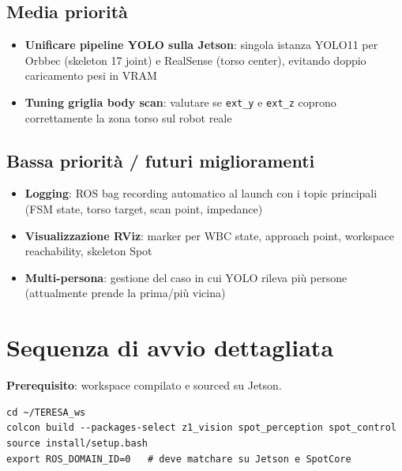 \documentclass[a4paper,11pt]{article}
\begin{document}
\begin{todobox}
\subsection*{Media priorità}
\begin{itemize}[leftmargin=1.5em]
  \item[$\square$] \textbf{Unificare pipeline YOLO sulla Jetson}: singola istanza YOLO11
        per Orbbec (skeleton 17 joint) e RealSense (torso center),
        evitando doppio caricamento pesi in VRAM
  \item[$\square$] \textbf{Tuning griglia body scan}: valutare se \texttt{ext\_y} e
        \texttt{ext\_z} coprono correttamente la zona torso sul robot reale
\end{itemize}

\subsection*{Bassa priorità / futuri miglioramenti}
\begin{itemize}[leftmargin=1.5em]
  \item[$\square$] \textbf{Logging}: ROS bag recording automatico al launch
        con i topic principali (FSM state, torso target, scan point, impedance)
  \item[$\square$] \textbf{Visualizzazione RViz}: marker per WBC state, approach point,
        workspace reachability, skeleton Spot
  \item[$\square$] \textbf{Multi-persona}: gestione del caso in cui YOLO rileva
        più persone (attualmente prende la prima/più vicina)
\end{itemize}
\end{todobox}

\section{Sequenza di avvio dettagliata}

\begin{warnbox}
\textbf{Prerequisito}: workspace compilato e sourced su Jetson.
\begin{lstlisting}
cd ~/TERESA_ws
colcon build --packages-select z1_vision spot_perception spot_control
source install/setup.bash
export ROS_DOMAIN_ID=0   # deve matchare su Jetson e SpotCore
\end{lstlisting}
\end{warnbox}
\end{document}
